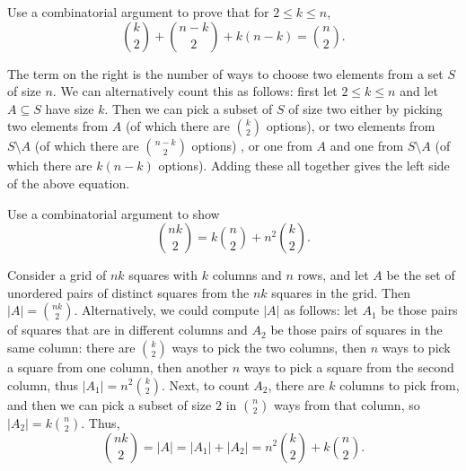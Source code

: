 \documentclass[11pt,dvipsnames]{book}
\numberwithin{equation}{section} %
\numberwithin{figure}{section} %
\numberwithin{table}{section} %
\begin{document}
\begin{exercise} Use a combinatorial argument to prove that  for $2\leq k\leq n$, 
\[
{k \choose 2} + {n-k \choose 2}+k(n-k) = {n \choose 2}.\]
\begin{solution}
The term on the right is the number of ways to choose two elements from a set $S$ of size $n$. We can alternatively count this as follows: first let $2\leq k\leq n$ and let $A\subseteq S$ have size $k$. Then we can pick a subset of $S$ of size two either by picking two elements from $A$ (of which there are ${k \choose 2}  $ options), or two elements from $S\setminus A$ (of which there  are ${n-k \choose 2}$ options) , or one from $A$ and one from $S\setminus A$ (of which there are $k(n-k)$ options). Adding these all together gives the left side of the above equation.
\end{solution}
\end{exercise}




\begin{exercise}
 Use a combinatorial argument to show
\[
\binom{nk}{2} = k \binom{n}{2} + n^2 \binom{k}{2}.
\]



\begin{solution}


Consider a grid of $nk$ squares with $k$ columns and $n$ rows, and let $A$ be the set of unordered pairs of distinct squares from the $nk$ squares in the grid. Then $|A|=\binom{nk}{2}$. Alternatively, we could compute $|A|$ as follows: let $A_{1}$ be those pairs of squares that are in different columns and $A_{2}$ be those pairs of squares in the same column: there are $ \binom{k}{2}$ ways to pick the two columns, then $n$ ways to pick a square from one column, then another $n$ ways to pick a square from the second column, thus $|A_{1}|=n^2 \binom{k}{2}$. Next, to count $A_{2}$, there are $k$ columns to pick from, and then we can pick a subset of size $2$ in $ \binom{n}{2}$ ways from that column, so $|A_{2}|=k \binom{n}{2} $. Thus,
\[
\binom{nk}{2} = |A|=|A_{1}|+|A_{2}|= n^2 \binom{k}{2}+k \binom{n}{2} .
\]

\end{solution}

\end{exercise}
\end{document}
